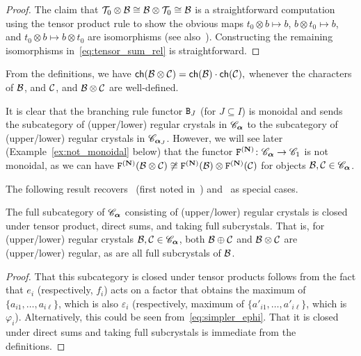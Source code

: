 \documentclass[11pt]{article}
\begin{document}
\begin{proof}
The claim that $\mathcal{T}_0 \otimes \mathcal{B} \cong \mathcal{B} \otimes \mathcal{T}_0 \cong \mathcal{B}$ is a straightforward computation using the tensor product rule to show the obvious maps
$t_0 \otimes b \mapsto b$,
$b \otimes t_0 \mapsto b$,
and
$t_0 \otimes b \mapsto b \otimes t_0$
are isomorphisms (see also~\cite[Ex.~1.3.4]{Kashiwara93}).
Constructing the remaining isomorphisms in~\eqref{eq:tensor_sum_rel} is straightforward.
\end{proof}

From the definitions, we have
$
\mathsf{ch}(\mathcal{B} \otimes \mathcal{C}) = \mathsf{ch}(\mathcal{B}) \cdot \mathsf{ch}(\mathcal{C}),
$
whenever the characters of $\mathcal{B}$, and $\mathcal{C}$, and $\mathcal{B} \otimes \mathcal{C}$ are well-defined.

It is clear that the branching rule functor $\mathtt{B}_{J}$ (for $J \subseteq I$) is monoidal and sends the subcategory of (upper/lower) regular crystals in $\mathscr{C}_{\boldsymbol{\alpha}}$ to the subcategory of (upper/lower) regular crystals in $\mathscr{C}_{\boldsymbol{\alpha}_J}$. 
However, we will see later (Example~\ref{ex:not_monoidal} below) that the functor $\mathtt{F}^{(\mathbf{N})} \colon \mathscr{C}_{\boldsymbol{\alpha}} \to \mathscr{C}_1$ is not monoidal, as we can have $
\mathtt{F}^{(\mathbf{N})}(\mathcal{B} \otimes \mathcal{C}) \not\cong \mathtt{F}^{(\mathbf{N})}(\mathcal{B}) \otimes \mathtt{F}^{(\mathbf{N})}(\mathcal{C})$
for objects $\mathcal{B}, \mathcal{C} \in \mathscr{C}_{\boldsymbol{\alpha}}$.


 
The following result recovers~\cite[Prop.~2.29]{BumpSchilling} (first noted in~\cite[\S1.3]{Kashiwara93}) and~\cite[Thm.~4.26]{MT2023} as special cases.
 
\begin{proposition}
\label{prop:regular_tensor_closed}
The full subcategory of $\mathscr{C}_{\boldsymbol{\alpha}}$ consisting of (upper/lower) regular crystals is closed under tensor product, direct sums, and taking full subcrystals.
That is, for (upper/lower) regular crystals $\mathcal{B}, \mathcal{C} \in \mathscr{C}_{\boldsymbol{\alpha}}$, both $\mathcal{B}\oplus \mathcal{C}$ and $\mathcal{B} \otimes \mathcal{C}$ are (upper/lower) regular, as are all full subcrystals of $\mathcal{B}$.
\end{proposition}
 
\begin{proof}
That this subcategory is closed under tensor products follows from the fact that $e_i$ (respectively, $f_i$) acts on a factor that obtains the maximum of $\{a_{i1}, \dotsc, a_{i\ell}\}$, which is also $\varepsilon_i$ (respectively, maximum of $\{a'_{i1}, \dotsc, a'_{i\ell}\}$, which is $\varphi_i$).
Alternatively, this could be seen from~\eqref{eq:simpler_ephi}.
That it is closed under direct sums and taking full subcrystals is immediate from the definitions.
\end{proof}
\end{document}
